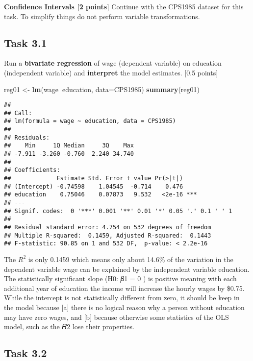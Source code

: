 \documentclass[
]{article}
\newenvironment{Shaded}{\begin{snugshade}}{\end{snugshade}}
\newcommand{\DataTypeTok}[1]{\textcolor[rgb]{0.13,0.29,0.53}{#1}}
\newcommand{\KeywordTok}[1]{\textcolor[rgb]{0.13,0.29,0.53}{\textbf{#1}}}
\newcommand{\NormalTok}[1]{#1}
\newcommand{\OperatorTok}[1]{\textcolor[rgb]{0.81,0.36,0.00}{\textbf{#1}}}
\newcommand{\StringTok}[1]{\textcolor[rgb]{0.31,0.60,0.02}{#1}}
\begin{document}
\textbf{Confidence Intervals {[}2 points{]}} Continue with the CPS1985
dataset for this task. To simplify things do not perform variable
transformations.

\hypertarget{task-3.1}{%
\subsection{Task 3.1}\label{task-3.1}}

Run a \textbf{bivariate regression} of wage (dependent variable) on
education (independent variable) and \textbf{interpret} the model
estimates. {[}0.5 points{]}

\begin{Shaded}
\begin{Highlighting}[]
\NormalTok{reg01 <-}\StringTok{ }\KeywordTok{lm}\NormalTok{(wage}\OperatorTok{~}\NormalTok{education, }\DataTypeTok{data=}\NormalTok{CPS1985)}
\KeywordTok{summary}\NormalTok{(reg01)}
\end{Highlighting}
\end{Shaded}

\begin{verbatim}
## 
## Call:
## lm(formula = wage ~ education, data = CPS1985)
## 
## Residuals:
##    Min     1Q Median     3Q    Max 
## -7.911 -3.260 -0.760  2.240 34.740 
## 
## Coefficients:
##             Estimate Std. Error t value Pr(>|t|)    
## (Intercept) -0.74598    1.04545  -0.714    0.476    
## education    0.75046    0.07873   9.532   <2e-16 ***
## ---
## Signif. codes:  0 '***' 0.001 '**' 0.01 '*' 0.05 '.' 0.1 ' ' 1
## 
## Residual standard error: 4.754 on 532 degrees of freedom
## Multiple R-squared:  0.1459, Adjusted R-squared:  0.1443 
## F-statistic: 90.85 on 1 and 532 DF,  p-value: < 2.2e-16
\end{verbatim}

The \(R^2\) is only 0.1459 which means only about 14.6\% of the
variation in the dependent variable wage can be explained by the
independent variable education. The statistically significant slope (H0:
𝛽1 = 0 ) is positive meaning with each additional year of education the
income will increase the hourly wages by \$0.75. While the intercept is
not statistically different from zero, it should be keep in the model
because {[}a{]} there is no logical reason why a person without
education may have zero wages, and {[}b{]} because otherwise some
statistics of the OLS model, such as the 𝑅2 lose their properties.

\hypertarget{task-3.2}{%
\subsection{Task 3.2}\label{task-3.2}}
\end{document}
